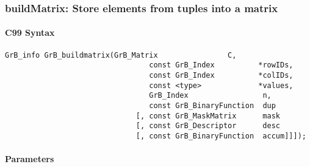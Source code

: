 \subsubsection{{\sf buildMatrix}: Store elements from tuples into a matrix}


\paragraph{C99 Syntax}

\begin{Verbatim}[samepage=true]	
        GrB_info GrB_buildmatrix(GrB_Matrix                C,
                                 const GrB_Index          *rowIDs,
                                 const GrB_Index          *colIDs, 
                                 const <type>             *values,
                                 GrB_Index                 n,
                                 const GrB_BinaryFunction  dup
                              [, const GrB_MaskMatrix      mask
                              [, const GrB_Descriptor      desc
                              [, const GrB_BinaryFunction  accum]]]);
\end{Verbatim}

\paragraph{Parameters}

